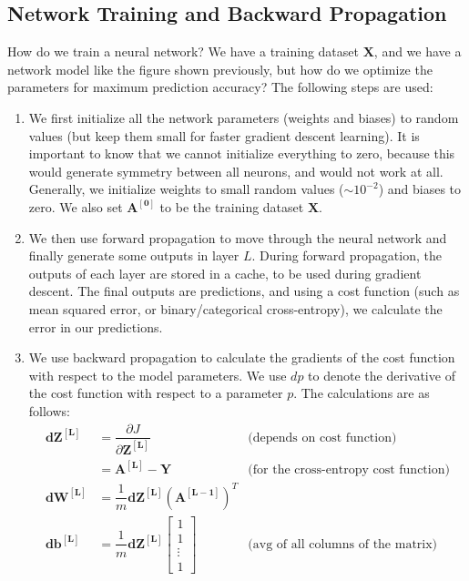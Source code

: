 \documentclass[a4paper, 12pt]{article}
\begin{document}
\subsection{Network Training and Backward Propagation}
How do we train a neural network? We have a training dataset $\bm{X}$, and we have a network model like the figure shown previously, but how do we optimize the parameters for maximum prediction accuracy? The following steps are used:
\begin{enumerate}
\item We first initialize all the network parameters (weights and biases) to random values (but keep them small for faster gradient descent learning). It is important to know that we cannot initialize everything to zero, because this would generate symmetry between all neurons, and would not work at all. Generally, we initialize weights to small random values ($\sim 10^{-2}$) and biases to zero. We also set $\bm{A^{\left[0\right]}}$ to be the training dataset $\bm{X}$.
\item We then use forward propagation to move through the neural network and finally generate some outputs in layer $L$. During forward propagation, the outputs of each layer are stored in a cache, to be used during gradient descent. The final outputs are predictions, and using a cost function (such as mean squared error, or binary/categorical cross-entropy), we calculate the error in our predictions.
\item We use backward propagation to calculate the gradients of the cost function with respect to the model parameters. We use $dp$ to denote the derivative of the cost function with respect to a parameter $p$. The calculations are as follows:
\begin{align*}
\bm{dZ^{\left[L\right]}} &= \dfrac{\partial J}{\partial \bm{Z^{\left[L\right]}}} & \text{(depends on cost function)} \\
&= \bm{A^{\left[L\right]}} - \bm{Y} & \text{(for the cross-entropy cost function)} \\
\bm{dW^{\left[L\right]}} &= \dfrac{1}{m}\bm{dZ^{\left[L\right]}}\left(\bm{A^{\left[L-1\right]}}\right)^T &\\
\bm{db^{\left[L\right]}} &= \dfrac{1}{m}\bm{dZ^{\left[L\right]}}
\begin{bmatrix}
1 \\ 1 \\ \vdots \\ 1
\end{bmatrix}
& \text{(avg of all columns of the matrix)} \\

\end{align*}
\end{enumerate}
\end{document}
